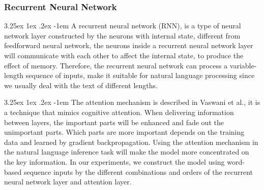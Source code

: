 \documentclass[12pt]{article}
\makeatletter
\renewcommand\paragraph{\@startsection{paragraph}{5}{\z@}%
  {3.25ex \@plus1ex \@minus.2ex}%
  {-1em}%
  {\normalfont\normalsize\bfseries}}
\makeatother
\begin{document}
\begin{CJK*}{UTF8}{bkai}
\begin{spacing}{1.77}
\subsubsection{Recurrent Neural Network}
\paragraph{}
A recurrent neural network (RNN), is a type of neural network layer constructed by the neurons with internal state, different from feedforward neural network, the neurons inside a recurrent neural network layer will communicate with each other to affect the internal state, to produce the effect of memory. Therefore, the recurrent neural network can process a variable-length sequence of inputs, make it suitable for natural language processing since we usually deal with the text of different lengths.



\paragraph{}
The attention mechanism is described in Vaswani et al.\cite{vaswani2017attention}, it is a technique that mimics cognitive attention. When delivering information between layers, the important parts will be enhanced and fade out the unimportant parts. Which parts are more important depends on the training data and learned by gradient backpropagation. Using the attention mechanism in the natural language inference task will make the model more concentrated on the key information. In our experiments, we construct the model using word-based sequence inputs by the different combinations and orders of the recurrent neural network layer and attention layer.


\end{spacing}
\end{CJK*}
\end{document}
